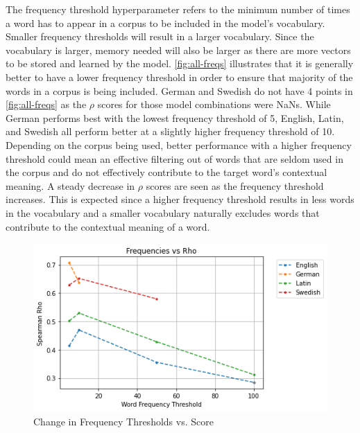 The frequency threshold hyperparameter refers to the minimum number of times a word has to appear in a corpus to be included in the model’s vocabulary. Smaller frequency thresholds will result in a larger vocabulary. Since the vocabulary is larger, memory needed will also be larger as there are more vectors to be stored and learned by the model.  \autoref{fig:all-freqs} illustrates that it is generally better to have a lower frequency threshold in order to ensure that majority of the words in a corpus is being included. German and Swedish do not have 4 points in \autoref{fig:all-freqs} as the $\rho$ scores for those model combinations were NaNs. While German performs best with the lowest frequency threshold of 5, English, Latin, and Swedish all perform better at a slightly higher frequency threshold of 10. Depending on the corpus being used, better performance with a higher frequency threshold could mean an effective filtering out of words that are seldom used in the corpus and do not effectively contribute to the target word's contextual meaning. A steady decrease in $\rho$ scores are seen as the frequency threshold increases. This is expected since a higher frequency threshold results in less words in the vocabulary and a smaller vocabulary naturally excludes words that contribute to the contextual meaning of a word. 

\begin{figure}[h]
  \centering
  \includegraphics[width=.8\linewidth]{sections/figures/freqs_all.png}
  \caption{Change in Frequency Thresholds vs. Score}
  \label{fig:all-freqs}
\end{figure}

